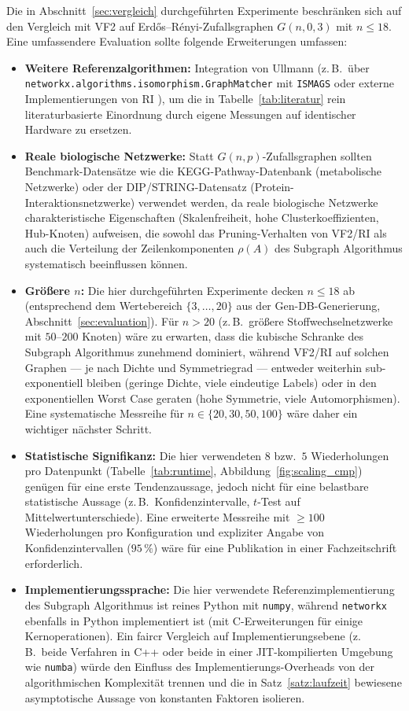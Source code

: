 \documentclass[a4paper,12pt]{article}
\theoremstyle{definition}
\begin{document}
Die in Abschnitt~\ref{sec:vergleich} durchgeführten Experimente beschränken sich auf den Vergleich mit VF2 auf Erdős–Rényi-Zufallsgraphen $G(n,0{,}3)$ mit $n\le 18$. Eine umfassendere Evaluation sollte folgende Erweiterungen umfassen:

\begin{itemize}
	\item \textbf{Weitere Referenzalgorithmen:} Integration von Ullmann \cite{ullmann1976} (z.\,B.\ über \texttt{networkx.algorithms.isomorphism.GraphMatcher} mit \texttt{ISMAGS} oder externe Implementierungen von RI \cite{bonnici2013}), um die in Tabelle~\ref{tab:literatur} rein literaturbasierte Einordnung durch eigene Messungen auf identischer Hardware zu ersetzen.
	\item \textbf{Reale biologische Netzwerke:} Statt $G(n,p)$-Zufallsgraphen sollten Benchmark-Datensätze wie die KEGG-Pathway-Datenbank (metabolische Netzwerke) oder der DIP/STRING-Datensatz (Protein-Interaktionsnetzwerke) verwendet werden, da reale biologische Netzwerke charakteristische Eigenschaften (Skalenfreiheit, hohe Clusterkoeffizienten, Hub-Knoten) aufweisen, die sowohl das Pruning-Verhalten von VF2/RI als auch die Verteilung der Zeilenkomponenten $\rho(A)$ des Subgraph Algorithmus systematisch beeinflussen können.
	\item \textbf{Größere $n$:} Die hier durchgeführten Experimente decken $n\le 18$ ab (entsprechend dem Wertebereich $\{3,\ldots,20\}$ aus der Gen-DB-Generierung, Abschnitt~\ref{sec:evaluation}). Für $n>20$ (z.\,B.\ größere Stoffwechselnetzwerke mit $50$--$200$ Knoten) wäre zu erwarten, dass die kubische Schranke des Subgraph Algorithmus zunehmend dominiert, während VF2/RI auf solchen Graphen — je nach Dichte und Symmetriegrad — entweder weiterhin sub-exponentiell bleiben (geringe Dichte, viele eindeutige Labels) oder in den exponentiellen Worst Case geraten (hohe Symmetrie, viele Automorphismen). Eine systematische Messreihe für $n\in\{20,30,50,100\}$ wäre daher ein wichtiger nächster Schritt.
	\item \textbf{Statistische Signifikanz:} Die hier verwendeten $8$ bzw.\ $5$ Wiederholungen pro Datenpunkt (Tabelle~\ref{tab:runtime}, Abbildung~\ref{fig:scaling_cmp}) genügen für eine erste Tendenzaussage, jedoch nicht für eine belastbare statistische Aussage (z.\,B.\ Konfidenzintervalle, $t$-Test auf Mittelwertunterschiede). Eine erweiterte Messreihe mit $\ge 100$ Wiederholungen pro Konfiguration und expliziter Angabe von Konfidenzintervallen ($95\,\%$) wäre für eine Publikation in einer Fachzeitschrift erforderlich.
	\item \textbf{Implementierungssprache:} Die hier verwendete Referenzimplementierung des Subgraph Algorithmus ist reines Python mit \texttt{numpy}, während \texttt{networkx} ebenfalls in Python implementiert ist (mit C-Erweiterungen für einige Kernoperationen). Ein faircr Vergleich auf Implementierungsebene (z.\,B.\ beide Verfahren in C++ oder beide in einer JIT-kompilierten Umgebung wie \texttt{numba}) würde den Einfluss des Implementierungs-Overheads von der algorithmischen Komplexität trennen und die in Satz~\ref{satz:laufzeit} bewiesene asymptotische Aussage von konstanten Faktoren isolieren.
\end{itemize}
\end{document}
